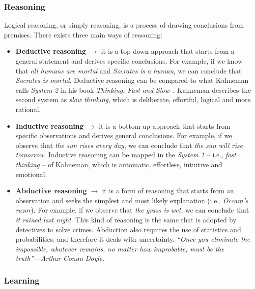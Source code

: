 \subsubsection{Reasoning}\label{subsubsec:reasoning}
%
Logical reasoning, or simply reasoning, is a process of drawing conclusions from premises.
%
There exists three main ways of reasoning:
%
\begin{itemize}
    \item \textbf{Deductive reasoning} $\rightarrow$ it is a top-down approach that starts from a general statement and derives specific conclusions.
    For example, if we know that \emph{all humans are mortal} and \emph{Socrates is a human}, we can conclude that \emph{Socrates is mortal}.
    Deductive reasoning can be compared to what Kahneman calls \emph{System 2} in his book \emph{Thinking, Fast and Slow}~\cite{kahneman2011thinking}.
    Kahneman describes the second system as \emph{slow thinking}, which is deliberate, effortful, logical and more rational.
    \item \textbf{Inductive reasoning} $\rightarrow$ it is a bottom-up approach that starts from specific observations and derives general conclusions.
    For example, if we observe that \emph{the sun rises every day}, we can conclude that \emph{the sun will rise tomorrow}.
    Inductive reasoning can be mapped in the \emph{System 1} -- i.e., \emph{fast thinking} -- of Kahneman, which is automatic, effortless, intuitive and emotional.
    \item \textbf{Abductive reasoning} $\rightarrow$ it is a form of reasoning that starts from an observation and seeks the simplest and most likely explanation (i.e., \emph{Occam's razor}).
    For example, if we observe that \emph{the grass is wet}, we can conclude that \emph{it rained last night}.
    This kind of reasoning is the same that is adopted by detectives to solve crimes.
    Abduction also requires the use of statistics and probabilities, and therefore it deals with uncertainty.
    \emph{``Once you eliminate the impossible, whatever remains, no matter how improbable, must be the truth''---Arthur Conan Doyle}.
\end{itemize}

\subsubsection{Learning}\label{subsubsec:learning}
%




